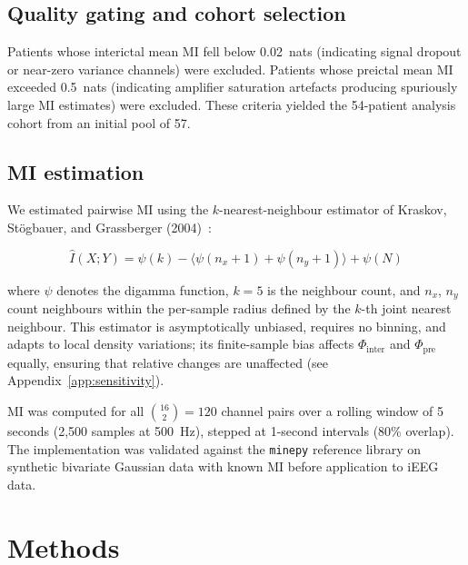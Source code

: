 \documentclass[a4paper,fleqn]{cas-dc}
\begin{document}
\subsection{Quality gating and cohort selection}
\label{sec:qc}

Patients whose interictal mean MI fell below 0.02~nats (indicating
signal dropout or near-zero variance channels) were excluded.
%
Patients whose preictal mean MI exceeded 0.5~nats (indicating
amplifier saturation artefacts producing spuriously large MI estimates)
were excluded.
%
These criteria yielded the 54-patient analysis cohort from an initial
pool of 57.

\subsection{MI estimation}

We estimated pairwise MI using the $k$-nearest-neighbour estimator of
Kraskov, St\"{o}gbauer, and Grassberger (2004)~\citep{kraskov2004}:

\begin{equation}
  \hat{I}(X; Y)
    = \psi(k)
      - \bigl\langle \psi(n_x + 1) + \psi(n_y + 1) \bigr\rangle
      + \psi(N)
  \label{eq:kraskov}
\end{equation}

\noindent
where $\psi$ denotes the digamma function, $k = 5$ is the neighbour
count, and $n_x$, $n_y$ count neighbours within the per-sample radius
defined by the $k$-th joint nearest neighbour.
%
This estimator is asymptotically unbiased, requires no binning, and
adapts to local density variations; its finite-sample bias affects
$\Phi_{\text{inter}}$ and $\Phi_{\text{pre}}$ equally, ensuring that
relative changes are unaffected (see Appendix~\ref{app:sensitivity}).

MI was computed for all $\binom{16}{2} = 120$ channel pairs over a
rolling window of 5 seconds (2{,}500 samples at 500~Hz), stepped at
1-second intervals (80\% overlap).
%
The implementation was validated against the \texttt{minepy} reference
library on synthetic bivariate Gaussian data with known MI before
application to iEEG data.

\section{Methods}
\label{sec:methods}
\end{document}

